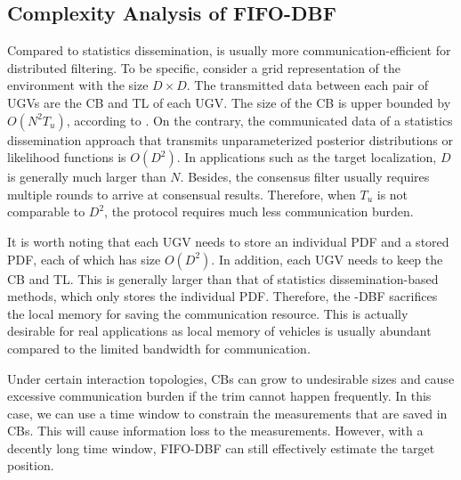 	\subsection{Complexity Analysis of FIFO-DBF}\label{subsec:complexity}
	Compared to statistics dissemination, {\proto} is usually more communication-efficient for distributed filtering. 
	To be specific, consider a grid representation of the environment with the size $D\times D$. %
	The transmitted data between each pair of UGVs are the CB and TL of each UGV.
	The size of the CB is upper bounded by $O(N^2T_u)$, according to .
	On the contrary, the communicated data of a statistics dissemination approach that transmits unparameterized posterior distributions or likelihood functions is $O(D^2)$.
	In applications such as the target localization, $D$ is generally much larger than $N$. 
	Besides, the consensus filter usually requires multiple rounds to arrive at consensual results.
	Therefore, when $T_u$ is not comparable to $D^2$, the {\proto} protocol requires much less communication burden.
	
	It is worth noting that each UGV needs to store an individual PDF and a stored PDF, each of which has size $O(D^2)$. 
	In addition, each UGV needs to keep the CB and TL.
	This is generally larger than that of statistics dissemination-based methods, which only stores the individual PDF.
	Therefore, the \proto-DBF sacrifices the local memory for saving the communication resource.
	This is actually desirable for real applications as local memory of vehicles is usually abundant compared to the limited bandwidth for communication.
	
	\begin{rem}
		Under certain interaction topologies, CBs can grow to undesirable sizes and cause excessive communication burden if the trim cannot happen frequently.
		In this case, we can use a time window to constrain the measurements that are saved in CBs.
		This will cause information loss to the measurements.
		However, with a decently long time window, FIFO-DBF can still effectively estimate the target position.
	\end{rem}